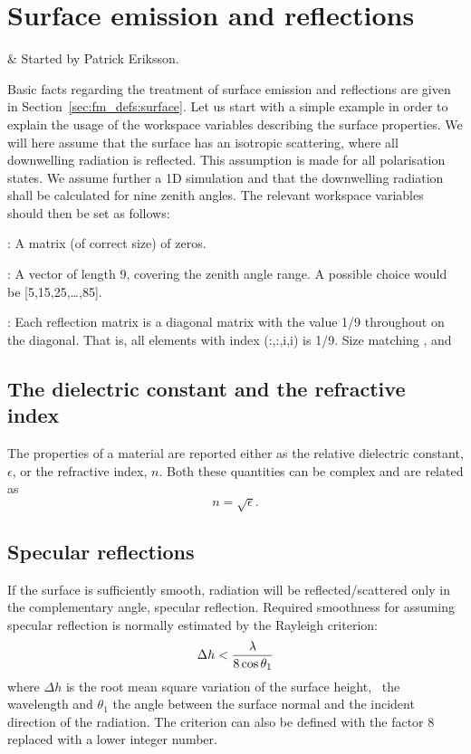 \chapter{Surface emission and reflections}
 \label{sec:surface}


 & Started by Patrick Eriksson. \\
\stophistory


Basic facts regarding the treatment of surface emission and
reflections are given in Section~\ref{sec:fm_defs:surface}.  Let us
start with a simple example in order to explain the usage of the
workspace variables describing the surface properties. We will here
assume that the surface has an isotropic scattering, where all
downwelling radiation is reflected. This assumption is made for all
polarisation states. We assume further a 1D simulation and that the
downwelling radiation shall be calculated for nine zenith angles. The
relevant workspace variables should then be set as follows:
  
 : A matrix (of correct size) of zeros.

 : A vector of length 9, covering the zenith
 angle range. A possible choice would be [5,15,25,\dots,85].
 
 : Each reflection matrix is a diagonal
 matrix with the value 1/9 throughout on the diagonal. That is, all
 elements with index (:,:,i,i) is 1/9. Size matching
 ,  and


\section{The dielectric constant and the refractive index}

 The properties of a material are reported either as the relative
 dielectric constant, $\epsilon$, or the refractive index, $n$. Both
 these quantities can be complex and are related as
 \begin{equation}
   \label{eq:rte_eps2n}
   n = \sqrt{\epsilon}.
 \end{equation}


\section{Specular reflections}
 \label{sec:rte:surface:specular}
 
 If the surface is sufficiently smooth, radiation will be
 reflected/scattered only in the complementary angle, specular
 reflection. Required smoothness for assuming specular reflection is
 normally estimated by the Rayleigh criterion:
 \begin{equation}
   \label{eq:rte:rayleigh}
   \Delta h < \frac{\lambda}{8\cos\theta_1}
 \end{equation}
 where $\Delta h$ is the root mean square variation of the surface
 height, \Wvl\ the wavelength and $\theta_1$ the angle between the
 surface normal and the incident direction of the radiation. The
 criterion can also be defined with the factor 8 replaced with a lower
 integer number.
 
